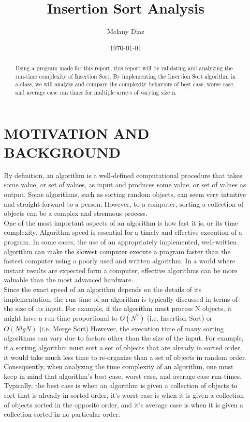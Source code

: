 \documentclass[12pt]{article}
\author{Melany Diaz}
\title{Insertion Sort Analysis}
\date{\today}
\begin{document}
\maketitle

\begin{abstract}
	
	Using a program made for this report, this report will be validating and analyzing the run-time complexity of Insertion Sort. By implementing the Insertion Sort algorithm in a class, we will analyze and compare the complexity behaviors of best case, worse case, and average case run times for multiple arrays of varying size n.   
\end{abstract}
\section*{MOTIVATION AND BACKGROUND}

	\indent By definition, an algorithm is a well-defined computational procedure that takes some value, or set of values, as input and produces some value, or set of values as output. Some algorithms, such as sorting random objects, can seem very intuitive and straight-forward to a person. However, to a computer, sorting a collection of objects can be a complex and strenuous process.\\
	
	One of the most important aspects of an algorithm is how fast it is, or its time complexity. Algorithm speed is essential for a timely and effective execution of a program. In some cases, the use of an appropriately implemented, well-written algorithm can make the slowest computer execute a program faster than the fastest computer using a poorly used and written algorithm. In a world where instant results are expected form a computer, effective algorithms can be more valuable than the most advanced hardware. \\
	
	Since the exact speed of an algorithm depends on the details of its implementation, the run-time of an algorithm is typically discussed in terms of the size of its input. For example, if the algorithm must process N objects, it might have a run-time proportional to $O(N^2)$ (i.e. Insertion Sort) or $O(NlgN)$ (i.e. Merge Sort) However, the execution time of many sorting algorithms can vary due to factors other than the size of the input. For example, if a sorting algorithm must sort a set of objects that are already in sorted order, it would take much less time to re-organize than a set of objects in random order. Consequently, when analyzing the time complexity of an algorithm, one must keep in mind that algorithm's best case, worst case, and average case run-times. Typically, the best case is when an algorithm is given a collection of objects to sort that is already in sorted order, it's worst case is when it is given a collection of objects sorted in the opposite order, and it's average case is when it is given a collection sorted in no particular order.	\\
	
\end{document}

